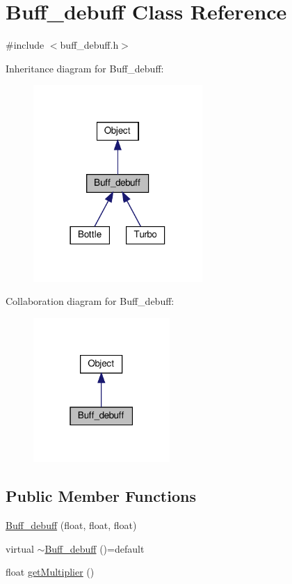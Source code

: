 \hypertarget{classBuff__debuff}{}\section{Buff\+\_\+debuff Class Reference}
\label{classBuff__debuff}


{\ttfamily \#include $<$buff\+\_\+debuff.\+h$>$}



Inheritance diagram for Buff\+\_\+debuff\+:\nopagebreak
\begin{figure}[H]
\begin{center}
\leavevmode
\includegraphics[width=182pt]{classBuff__debuff__inherit__graph}
\end{center}
\end{figure}


Collaboration diagram for Buff\+\_\+debuff\+:\nopagebreak
\begin{figure}[H]
\begin{center}
\leavevmode
\includegraphics[width=147pt]{classBuff__debuff__coll__graph}
\end{center}
\end{figure}
\subsection*{Public Member Functions}
\begin{DoxyCompactItemize}
\item 
\hyperlink{classBuff__debuff_a7548567887d6e7f2280d488c800a098b}{Buff\+\_\+debuff} (float, float, float)
\item 
virtual \hyperlink{classBuff__debuff_a86ea03d85641f61757f121c6e226fafc}{$\sim$\+Buff\+\_\+debuff} ()=default
\item 
float \hyperlink{classBuff__debuff_ad72e20ee3b29b7ba11d36aa05a24f838}{get\+Multiplier} ()
\end{DoxyCompactItemize}
